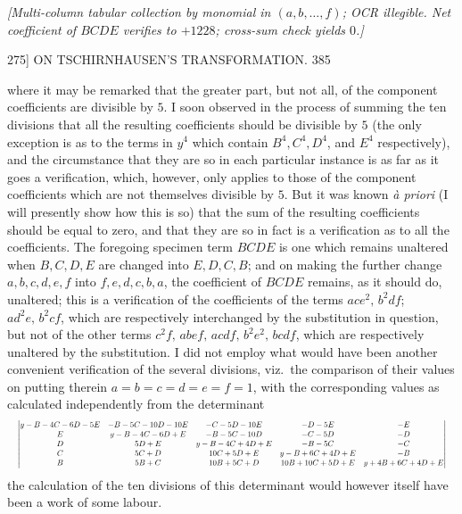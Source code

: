 \documentclass[11pt]{article}
\begin{document}
\smallskip
\noindent\textit{[Multi-column tabular collection by monomial in $(a,b,\dots,f)$; OCR illegible.
Net coefficient of $BCDE$ verifies to $+1228$; cross-sum check yields $0$.]}
\smallskip

\begin{center}
\textsc{275]} \hfill ON TSCHIRNHAUSEN'S TRANSFORMATION. \hfill 385
\end{center}

where it may be remarked that the greater part, but not all, of the component
coefficients are divisible by $5$. I soon observed in the process of summing the ten
divisions that all the resulting coefficients should be divisible by $5$ (the only exception
is as to the terms in $y^{4}$ which contain $B^{4},C^{4},D^{4}$, and $E^{4}$ respectively), and the
circumstance that they are so in each particular instance is as far as it goes
a verification, which, however, only applies to those of the component coefficients which
are not themselves divisible by $5$. But it was known \emph{\`a priori} (I will presently show
how this is so) that the sum of the resulting coefficients should be equal to zero,
and that they are so in fact is a verification as to all the coefficients. The foregoing
specimen term $BCDE$ is one which remains unaltered when $B,C,D,E$ are changed
into $E,D,C,B$; and on making the further change $a,b,c,d,e,f$ into $f,e,d,c,b,a$,
the coefficient of $BCDE$ remains, as it should do, unaltered; this is a verification of
the coefficients of the terms $ace^{2},\,b^{2}df$; $ad^{2}e,\,b^{2}cf$, which are respectively interchanged
by the substitution in question, but not of the other terms $c^{2}f,\,abef,\,acdf,\,b^{2}e^{2},\,bcdf$,
which are respectively unaltered by the substitution. I did not employ what would
have been another convenient verification of the several divisions, viz.\ the comparison
of their values on putting therein $a=b=c=d=e=f=1$, with the corresponding
values as calculated independently from the determinant
\[ \resizebox{\textwidth}{!}{$\displaystyle
\begin{vmatrix}
y-B-4C-6D-5E & -B-5C-10D-10E & -C-5D-10E & -D-5E & -E\\
E & y-B-4C-6D+E & -B-5C-10D & -C-5D & -D\\
D & 5D+E & y-B-4C+4D+E & -B-5C & -C\\
C & 5C+D & 10C+5D+E & y-B+6C+4D+E & -B\\
B & 5B+C & 10B+5C+D & 10B+10C+5D+E & y+4B+6C+4D+E
\end{vmatrix}
$} \]
the calculation of the ten divisions of this determinant would however itself have
been a work of some labour.
\end{document}
